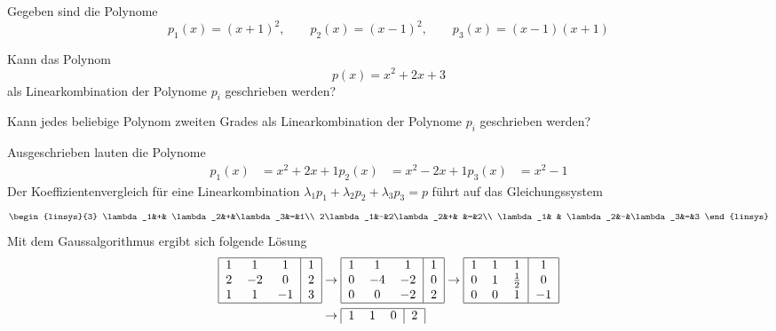 Gegeben sind die Polynome
\[
p_1(x)=(x+1)^2,\qquad
p_2(x)=(x-1)^2,\qquad
p_3(x)=(x-1)(x+1)
\]
\begin{teilaufgaben}
\item
Kann das Polynom
\[
p(x)=x^2+2x+3
\]
als Linearkombination der Polynome $p_i$
geschrieben werden?
\item Kann jedes beliebige Polynom zweiten Grades als Linearkombination der
Polynome $p_i$ geschrieben werden?
\end{teilaufgaben}


\begin{loesung}
\begin{teilaufgaben}
\item
Ausgeschrieben lauten die Polynome
\begin{align*}
p_1(x)&=x^2+2x+1
p_2(x)&=x^2-2x+1
p_3(x)&=x^2-1
\end{align*}
Der Koeffizientenvergleich für eine Linearkombination
$\lambda_1p_1+\lambda_2p_2+\lambda_3p_3=p$ führt auf das
Gleichungssystem
\[
\begin{linsys}{3}
\lambda_1&+& \lambda_2&+&\lambda_3&=&1\\
2\lambda_1&-&2\lambda_2&+&         &=&2\\
\lambda_1& & \lambda_2&-&\lambda_3&=&3
\end{linsys}
\]
Mit dem Gaussalgorithmus ergibt sich folgende Lösung
\begin{align*}
\begin{tabular}{|ccc|c|}
\hline
1&1&1&1\\
2&$-2$&0&2\\
1&1&$-1$&3\\
\hline
\end{tabular}
&\rightarrow
\begin{tabular}{|ccc|c|}
\hline
1&1&1&1\\
0&$-4$&$-2$&0\\
0&0&$-2$&2\\
\hline
\end{tabular}
\rightarrow
\begin{tabular}{|ccc|c|}
\hline
1&1&1&1\\
0&1&$\frac12$&0\\
0&0&1&$-1$\\
\hline
\end{tabular}
\\
&\rightarrow
\begin{tabular}{|ccc|c|}
\hline
1&1&0&2\\

\end{tabular}
\end{align*}
\end{teilaufgaben}
\end{loesung}
